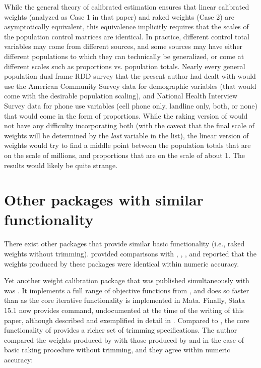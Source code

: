 
While the general theory of calibrated estimation \citep{deville:sarndal:1992}
ensures that linear calibrated weights (analyzed as Case 1 in that paper) and
raked weights (Case 2) are asymptotically equivalent, this equivalence implicitly
requires that the scales of the population control matrices are identical.
In practice, different control total variables may come from different sources,
and some sources may have either different populations to which they can technically
be generalized, or come at different scales such as proportions vs. population totals.
Nearly every general population dual frame RDD survey that the present author had dealt
with would use the American Community Survey data for demographic variables
(that would come with the desirable population scaling), and National Health Interview Survey
data for phone use variables (cell phone only, landline only, both, or none) that would
come in the form of proportions. While the raking version of  would not
have any difficulty incorporating both (with the caveat that the final scale of weights
will be determined by the \textit{last} variable in the  list),
the linear version of weights would try to find a middle point between the population
totals that are on the scale of millions, and proportions that are on the scale of about 1.
The results would likely be quite strange.

\section{Other packages with similar functionality}
\label{subsec:compare}

There exist other packages that provide similar basic functionality
(i.e., raked weights without trimming).
\citet{kolenikov:2014} provided comparisons with
 \citep{winter:2002},  \citep{bergmann:2011},
 \citep{wittenberg:2010}, and reported that the weights
produced by these packages were identical within numeric accuracy.

Yet another weight calibration
package that was published simultaneously with \citet{kolenikov:2014}
was  \citep{pacifico:2014}. It implements a full range
of objective functions from \citet{deville:sarndal:1992}, and does so faster
than  as the core iterative functionality is implemented in Mata.
Finally, Stata 15.1 now provides  command,
undocumented at the time of the writing of this paper, although described
and exemplified in detail in \citet{valliant:dever:2017}. Compared
to , the core functionality of  provides
a richer set of trimming specifications. The author compared the weights
produced by  with those produced by 
and 
in the case of basic raking procedure without trimming, and they agree within
numeric accuracy:

